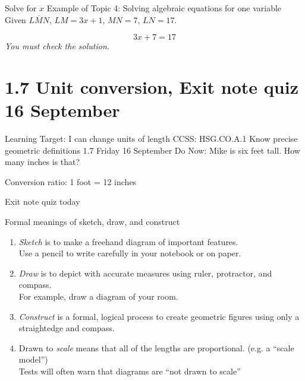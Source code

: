 \begin{frame}{Solve for $x$}
  {Example of Topic 4: Solving algebraic equations for one variable}
  Given $\overline{LMN}$, $LM=3x+1$, $MN=7$, $LN=17$.
    \begin{flushleft}
    \end{flushleft} \vspace{1cm}
  \large \[ 3x+7=17 \]  \vspace{1cm}
  \emph{You must check the solution.}
\end{frame}

\section{1.7 Unit conversion, Exit note quiz \hfill 16 September}
\begin{frame}{Learning Target: I can change units of length}
  {CCSS: HSG.CO.A.1 Know precise geometric definitions  \hfill \alert{1.7 Friday 16 September}}
  Do Now: Mike is six feet tall. How many inches is that? \par \vspace{0.25cm}
  Conversion ratio: 1 foot = 12 inches \par
  \vspace{3cm}
  \alert{Exit note quiz today}
\end{frame}

\begin{frame}{Formal meanings of sketch, draw, and construct}
  \begin{enumerate}
    \item \emph{Sketch} is to make a freehand diagram of important features. \\[0.15cm]
    Use a pencil to write carefully in your notebook or on paper.  \smallskip
    \item \emph{Draw}  is to depict with accurate measures using ruler, protractor, and compass.\\[0.15cm]
    For example, draw a diagram of your room. \smallskip
    \item \emph{Construct} is a formal, logical process to create geometric figures using only a straightedge and compass. \smallskip
    \item Drawn to \emph{scale} means that all of the lengths are proportional. (e.g. a ``scale model'')\\[0.15cm]
    Tests will often warn that diagrams are ``not drawn to scale''
  \end{enumerate}
\end{frame}


